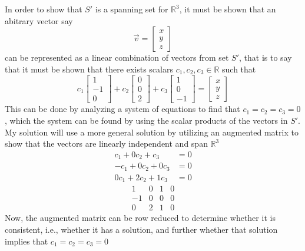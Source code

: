 \documentclass{report}
\begin{document}
In order to show that $S'$ is a spanning set for $\mathbb{R}^3$,  it must be shown that an abitrary vector say 
$$\vec{v} = \begin{bmatrix} x \\ y \\ z \end{bmatrix}$$ can be represented as a linear combination of vectors from set $S'$, that is to say that it must be shown that there exists scalars 
$c_1, c_2, c_3 \in \mathbb{R}$ such that 
$$
c_1 \begin{bmatrix} 1 \\ -1 \\ 0 \end{bmatrix} + 
c_2 \begin{bmatrix} 0 \\ 0 \\ 2 \end{bmatrix} + 
c_3 \begin{bmatrix} 1 \\ 0 \\ -1 \end{bmatrix} = 
\begin{bmatrix} x \\ y \\ z \end{bmatrix}
$$
This can be done by analyzing a system of equations to find that $c_1 = c_2 = c_3 = 0$, which the system can be found by using the scalar products of the vectors in $S'$. My solution will use a more general solution by utilizing an augmented matrix to show that the vectors are linearly independent and span $\mathbb{R}^3$
\begin{align*}
c_1 + 0 c_2 + c_3 & = 0 \\
-c_1 + 0 c_2 + 0 c_3 & = 0 \\
0 c_1 + 2 c_2 + 1 c_3 & = 0
\end{align*}
\[
\begin{array}{ccc|c}
1 & 0 & 1 & 0 \\
-1 & 0 & 0 & 0 \\
0 & 2 & 1 & 0
\end{array}
\]
Now, the augmented matrix can be row reduced to determine whether it is consistent, i.e., whether it has a solution, and further whether that solution implies that $c_1 = c_2 = c_3 = 0$
\end{document}
